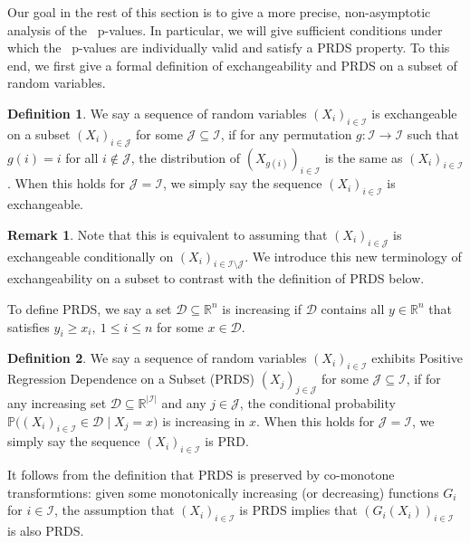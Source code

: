 \documentclass[a4paper,11pt]{article}
\theoremstyle{plain}
\theoremstyle{definition}
\newtheorem{definition}{Definition}
\newtheorem{remark}{Remark}
\def\PP{\mathbb{P}}
\def\RR{\mathbb{R}}
\def\calD{\mathcal{D}}
\def\calI{\mathcal{I}}
\def\calJ{\mathcal{J}}
\theoremstyle{plain}
\newcommand{\nickname}{{\text{RANC}}}
\begin{document}
Our goal in the rest of this section is to give a more precise,
non-asymptotic analysis of the \nickname~p-values. In
particular, we will give sufficient conditions under which the
\nickname~p-values are individually valid and satisfy a PRDS
property. To this end, we first give a formal definition of
exchangeability and PRDS on a subset of random variables.

\begin{definition}
  We say a sequence of random variables $(X_i)_{i \in \calI}$ is
  exchangeable on a subset $(X_i)_{i \in \calJ}$ for some $\calJ
  \subseteq \calI$, if for any
  permutation $g:\calI \to \calI$ such that $g(i) = i$ for
  all $i \not \in \calJ$, the distribution of $(X_{g(i)})_{i \in
    \calI}$ is the same as $(X_i)_{i \in \calI}$. When this holds for
  $\calJ = \calI$, we simply say the sequence $(X_i)_{i \in \calI}$ is exchangeable.
\end{definition}

\begin{remark}
  Note that this is equivalent to assuming that $(X_i)_{i \in \calJ}$
  is exchangeable conditionally on $(X_i)_{i \in \calI \setminus \calJ}$. We
  introduce this new terminology of exchangeability on a subset to
  contrast with the definition of PRDS below.
\end{remark}

To define PRDS, we say a set
$\calD \subseteq \RR^n$ is increasing if $\calD$ contains all $y
\in \RR^n$ that satisfies $y_i \ge x_i,~1 \le i \le n$ for some $x
\in \calD$.

\begin{definition}\label{defi:PRDS}
    We say a sequence of random variables $(X_i)_{i \in \calI}$ exhibits
    Positive Regression Dependence on a Subset (PRDS) $(X_j)_{j \in
      \calJ}$ for some $\calJ
    \subseteq \calI$, if for any increasing set $\calD
    \subseteq \RR^{|\calI|}$ and any $j \in \calJ$, the conditional
    probability $\PP\big((X_i)_{i \in \calI} \in \calD \mid X_j = x\big)$ is
    increasing in $x$. When this holds for $\calJ = \calI$, we simply
    say the sequence $(X_i)_{i \in \calI}$ is PRD.
\end{definition}

It follows from the definition that PRDS is preserved by co-monotone
transformtions: given some monotonically increasing (or decreasing)
functions $G_i$ for $i \in
\calI$, the assumption that $(X_i)_{i \in \calI}$ is PRDS implies that
$(G_i(X_i))_{i \in \calI}$ is also PRDS.
\end{document}
